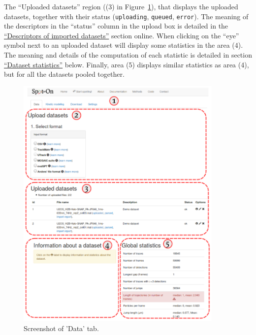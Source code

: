 
The ``Uploaded datasets'' region ((3) in Figure~\ref{fig:tuto2}), that displays the uploaded datasets, together with their status (\texttt{uploading}, \texttt{queued}, \texttt{error}). The meaning of the descriptors in the ``status'' column in the upload box is detailed in the \href{https://spoton.berkeley.edu/SPTGUI/docs/latest#import-codes}{``Descriptors of imported datasets''} section online. When clicking on the ``eye'' symbol next to an uploaded dataset will display some statistics in the area (4). The meaning and details of the computation of each statistic is detailed in section \href{https://spoton.berkeley.edu/SPTGUI/docs/latest#dataset-statistics}{``Dataset statistics''} below. Finally, area (5) displays similar statistics as area (4), but for all the datasets pooled together.

\begin{figure}[h!]
\centering
\includegraphics[width=0.9\textwidth]{../SPTGUI/static/SPTGUI/img/tutorial/0.7/tuto2.png}
\caption{\label{fig:tuto2}Screenshot of 'Data' tab.}
\end{figure}


